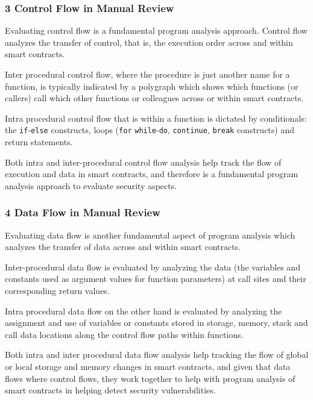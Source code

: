 \subsubsection{3 Control Flow in Manual
Review}\label{control-flow-in-manual-review}

Evaluating control flow is a fundamental program analysis approach.
Control flow analyzes the transfer of control, that is, the execution
order across and within smart contracts.

Inter procedural control flow, where the procedure is just another name
for a function, is typically indicated by a polygraph which shows which
functions (or callers) call which other functions or colleagues across
or within smart contracts.

Intra procedural control flow that is within a function is dictated by
conditionals: the \texttt{if}-\texttt{else} constructs, loops
(\texttt{for} \texttt{while}-\texttt{do}, \texttt{continue},
\texttt{break} constructs) and return statements.

Both intra and inter-procedural control flow analysis help track the
flow of execution and data in smart contracts, and therefore is a
fundamental program analysis approach to evaluate security aspects.

\subsubsection{4 Data Flow in Manual
Review}\label{data-flow-in-manual-review}

Evaluating data flow is another fundamental aspect of program analysis
which analyzes the transfer of data across and within smart contracts.

Inter-procedural data flow is evaluated by analyzing the data (the
variables and constants used as argument values for function parameters)
at call sites and their corresponding return values.

Intra procedural data flow on the other hand is evaluated by analyzing
the assignment and use of variables or constants stored in storage,
memory, stack and call data locations along the control flow paths
within functions.

Both intra and inter procedural data flow analysis help tracking the
flow of global or local storage and memory changes in smart contracts,
and given that data flows where control flows, they work together to
help with program analysis of smart contracts in helping detect security
vulnerabilities.

